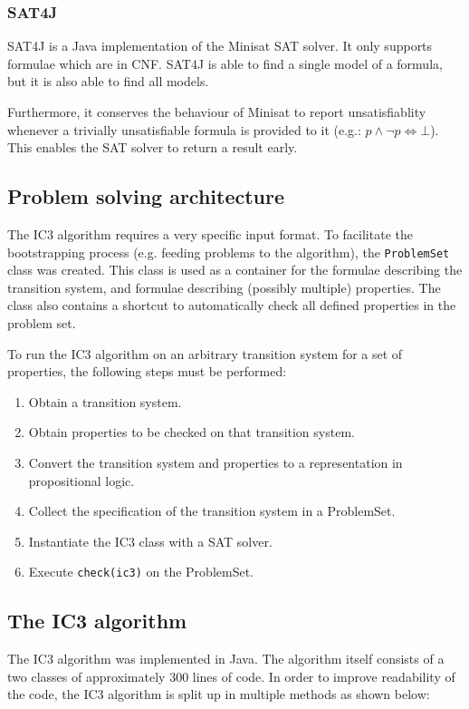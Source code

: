 \documentclass[a4paper]{article}
\begin{document}
\subsubsection{SAT4J}
SAT4J is a Java implementation of the Minisat SAT solver. It only supports formulae which are in CNF. SAT4J is able to find a single model of a formula, but it is also able to find all models.

Furthermore, it conserves the behaviour of Minisat to report unsatisfiablity whenever a trivially unsatisfiable formula is provided to it (e.g.: $p \land \lnot p \Leftrightarrow \bot$). This enables the SAT solver to return a result early.

\subsection{Problem solving architecture}
The IC3 algorithm requires a very specific input format. To facilitate the bootstrapping process (e.g. feeding problems to the algorithm), the \texttt{ProblemSet} class was created. This class is used as a container for the formulae describing the transition system, and formulae describing (possibly multiple) properties. The class also contains a shortcut to automatically check all defined properties in the problem set.

To run the IC3 algorithm on an arbitrary transition system for a set of properties, the following steps must be performed:
\begin{enumerate}
\item Obtain a transition system.
\item Obtain properties to be checked on that transition system.
\item Convert the transition system and properties to a representation in propositional logic.
\item Collect the specification of the transition system in a ProblemSet.
\item Instantiate the IC3 class with a SAT solver.
\item Execute \texttt{check(ic3)} on the ProblemSet.
\end{enumerate}

\newpage
\subsection{The IC3 algorithm}
The IC3 algorithm was implemented in Java. The algorithm itself consists of a two classes of approximately 300 lines of code. In order to improve readability of the code, the IC3 algorithm is split up in multiple methods as shown below:
\end{document}
